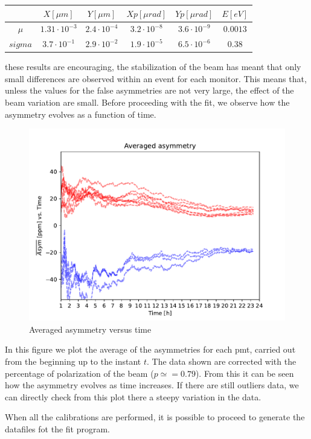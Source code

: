 \begin{center}
\begin{tabular}{|c|c|c|c|c|c|}
\hline 
\rule[-1ex]{0pt}{2.5ex} & $X [\mu m]$ & $Y[\mu m]$ & $Xp [\mu rad]$ & $Yp [\mu rad]$ & $E [eV]$ \\ 
\hline 
\rule[-1ex]{0pt}{2.5ex} $\mu$ & $1.31 \cdot 10^{-3}$ & $2.4 \cdot 10^{-4}$ & $3.2 \cdot 10^{-8} $ & $3.6 \cdot 10^{-9}$ & $0.0013$ \\ 
\hline 
\rule[-1ex]{0pt}{2.5ex} $sigma$ & $3.7 \cdot 10^{-1}$ & $2.9 \cdot 10^{-2}$ & $ 1.9 \cdot 10^{-5} $ & $6.5 \cdot 10^{-6}$ & $0.38$ \\ 
\hline 
\end{tabular} 
\end{center}

these results are encouraging, the stabilization of the beam has meant that only small differences are observed within an event for each monitor. This means that, unless the values for the false asymmetries are not very large, the effect of the beam variation are small.
Before proceeding with the fit, we observe how the asymmetry evolves as a function of time.

\begin{figure}[hbtp]
\centering
\includegraphics[width = 0.5 \textwidth]{Analysis/AveragedAsymmetry.pdf}
\caption{Averaged asymmetry versus time}
\end{figure}

In this figure we plot the average of the asymmetries for each pmt, carried out from the beginning up to the instant $t$. The data shown are corrected with the percentage of polarization of the beam ($p \simeq = 0.79$). From this it can be seen how the asymmetry evolves as time increases. If there are still outliers data, we can directly check from this plot there a steepy variation in the data. 


When all the calibrations are performed, it is possible to proceed to generate the datafiles fot the fit program.

